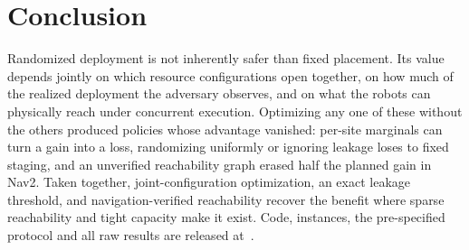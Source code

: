 \documentclass[letterpaper,journal]{IEEEtran}
\theoremstyle{remark}
\begin{document}
\section{Conclusion}
Randomized deployment is not inherently safer than fixed placement. Its value depends jointly on which resource configurations open together, on how much of the realized deployment the adversary observes, and on what the robots can physically reach under concurrent execution. Optimizing any one of these without the others produced policies whose advantage vanished: per-site marginals can turn a gain into a loss, randomizing uniformly or ignoring leakage loses to fixed staging, and an unverified reachability graph erased half the planned gain in Nav2. Taken together, joint-configuration optimization, an exact leakage threshold, and navigation-verified reachability recover the benefit where sparse reachability and tight capacity make it exist. Code, instances, the pre-specified protocol and all raw results are released at~\cite{alam2026code}.
\end{document}
